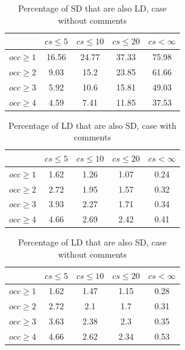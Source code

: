 \documentclass[a4paper,twoside]{article}
\begin{document}
\begin{table}[!h]
\renewcommand{\arraystretch}{1.25}
\caption{Percentage of SD that are also LD, case without comments}
\label{tab:percSD:nocomm}
\centering

\begin{tabular}{|c|c|c|c|c|}
\hline
	      &	$cs\leq 5$	&	$cs\leq 10$	&	$cs\leq 20$	&	$cs< \infty$	\\
\hline
$occ\geq 1$	&	16.56	&	24.77	&	37.33	&	75.98	\\
$occ\geq 2$	&	9.03	&	15.2	&	23.85	&	61.66	\\
$occ\geq 3$	&	5.92	&	10.6	&	15.81	&	49.03	\\
$occ\geq 4$	&	4.59	&	7.41	&	11.85	&	37.53	\\
\hline
\end{tabular}
\end{table}


\begin{table}[!h]
\renewcommand{\arraystretch}{1.25}
\caption{Percentage of LD that are also SD, case with comments}
\label{tab:percLD:comm}
\centering

\begin{tabular}{|c|c|c|c|c|}
\hline
	      &	$cs\leq 5$	&	$cs\leq 10$	&	$cs\leq 20$	&	$cs< \infty$	\\
\hline
$occ\geq 1$	&	1.62	&	1.26	&	1.07	&	0.24	\\
$occ\geq 2$	&	2.72	&	1.95	&	1.57	&	0.32	\\
$occ\geq 3$	&	3.93	&	2.27	&	1.71	&	0.34	\\
$occ\geq 4$	&	4.66	&	2.69	&	2.42	&	0.41	\\
\hline
\end{tabular}
\end{table}


\begin{table}[!h]
\renewcommand{\arraystretch}{1.25}
\caption{Percentage of LD that are also SD, case without comments}
\label{tab:percLD:nocomm}
\centering
\begin{tabular}{|c|c|c|c|c|}
\hline
	      &	$cs\leq 5$	&	$cs\leq 10$	&	$cs\leq 20$	&	$cs< \infty$	\\
\hline
$occ\geq 1$	&	1.62	&	1.47	&	1.15	&	0.28	\\
$occ\geq 2$	&	2.72	&	2.1	&	1.7	&	0.31	\\
$occ\geq 3$	&	3.63	&	2.38	&	2.3	&	0.35	\\
$occ\geq 4$	&	4.66	&	2.62	&	2.34	&	0.53	\\
\hline
\end{tabular}
\end{table}
\end{document}
